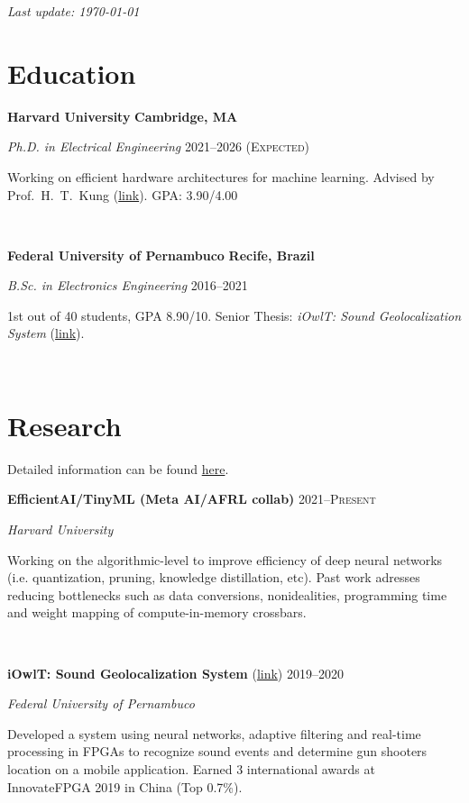 \documentclass[letterpaper,10pt]{article}
\newcommand{\entry}[4]{

\begin{minipage}[t]{.15\textwidth}
\end{minipage}
\hfill\vline\hfill 
\begin{minipage}[t]{0.95\textwidth}
#2 \hfill \textsc{#1}

\textit{#3}

\footnotesize{#4}
\end{minipage}\\\vspace{.25cm}}
\newcommand{\we}[5]{

\begin{minipage}[t]{.15\textwidth}
\end{minipage}
\hfill\vline\hfill 
\begin{minipage}[t]{0.95\textwidth}
#2 \hfill \textbf{#5}

\textit{#3} \hfill \textsc{#1}

\footnotesize{#4}
\end{minipage}\\\vspace{.25cm}}
\newcommand{\harv}{Harvard University}
\newcommand{\ufpe}{Federal University of Pernambuco}
\begin{document}
\par{\par}
\par{\par}
\par{\par}
\hfill \textit{Last update: \today}
\vspace{-.25cm}

\section{Education}
\vspace*{.1cm}
\we{2021--2026 (Expected)}{\textbf{\harv}}{Ph.D. in Electrical Engineering}{Working on efficient hardware architectures for machine learning. Advised by Prof.\ H.\ T.\ Kung (\href{https://www.eecs.harvard.edu/htk/}{link}). GPA: 3.90/4.00}{Cambridge, MA}

\we{2016--2021}{\textbf{\ufpe}}{B.Sc. in Electronics Engineering}{
	1st out of 40 students, GPA 8.90/10. Senior Thesis: \textit{iOwlT: Sound Geolocalization System} (\href{https://www.matheussfarias.com/assets/files/SeniorThesis.pdf}{link}).
	}{Recife, Brazil}

\vspace*{-.25cm}
\section{Research}

Detailed information can be found \href{https://www.matheussfarias.com/}{here}.

\vspace{.1cm}

\entry{2021--Present}{\textbf{EfficientAI/TinyML (Meta AI/AFRL collab)}}{\harv}{
	Working on the algorithmic-level to improve efficiency of deep neural networks (i.e. quantization, pruning, knowledge distillation, etc). Past work adresses reducing bottlenecks such as data conversions, nonidealities, programming time and weight mapping of compute-in-memory crossbars.
}

\entry{2019--2020}{\textbf{iOwlT: Sound Geolocalization System} (\href{https://www.matheussfarias.com/iowlt.html}{link})}{\ufpe}{
	Developed a system using neural networks, adaptive filtering and real-time processing in FPGAs to recognize sound events and determine gun shooters location on a mobile application. Earned 3 international awards at InnovateFPGA 2019 in China (Top 0.7\%).
}
\end{document}
